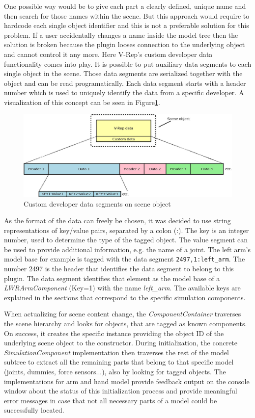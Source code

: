 One possible way would be to give each part a clearly defined, unique name and then search for those names within the scene. But this approach would require to hardcode each single object identifier and this is not a preferable solution for this problem. If a user accidentally changes a name inside the model tree then the solution is broken because the plugin looses connection to the underlying object and cannot control it any more. Here V-Rep's custom developer data functionality comes into play. It is possible to put auxiliary data segments to each single object in the scene. Those data segments are serialized together with the object and can be read programatically. Each data segment starts with a header number which is used to uniquely identify the data from a specific developer. A visualization of this concept can be seen in Figure\ref{fig:cust_dev_data}. 
\begin{figure}[h]
	\centering
  	\includegraphics[width=1.0\textwidth]{images/custom_dev_data.jpg}
	\caption{Custom developer data segments on scene object}
	\label{fig:cust_dev_data}
\end{figure}

As the format of the data can freely be chosen, it was decided to use string representations of key/value pairs, separated by a colon (:). The key is an integer number, used to determine the type of the tagged object. The value segment can be used to provide additional information, e.g. the name of a joint. The left arm's model base for example is tagged with the data segment \texttt{2497,1:left\_arm}. The number 2497 is the header that identifies the data segment to belong to this plugin. The data segment identifies that element as the model base of a \emph{LWRArmComponent} (Key=1) with the name \emph{left\_arm}. The available keys are explained in the sections that correspond to the specific simulation components.

When actualizing for scene content change, the \emph{ComponentContainer} traverses the scene hierarchy and looks for objects, that are tagged as known components. On success, it creates the specific instance providing the object ID of the underlying scene object to the constructor. During initialization, the concrete \emph{SimulationComponent} implementation then traverses the rest of the model subtree to extract all the remaining parts that belong to that specific model (joints, dummies, force sensors...), also by looking for tagged objects. The implementations for arm and hand model provide feedback output on the console window about the status of this initialization process and provide meaningful error messages in case that not all necessary parts of a model could be successfully located.

